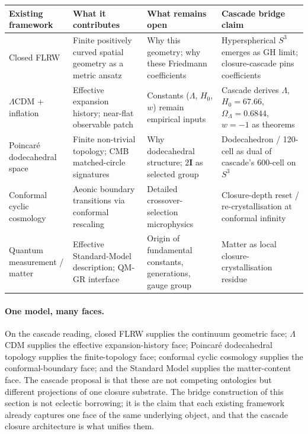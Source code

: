 \documentclass[11pt]{article}
\theoremstyle{plain}
\theoremstyle{definition}
\theoremstyle{remark}
\newcommand{\twoI}{2\mathbf{I}}
\begin{document}
\begin{center}
\renewcommand{\arraystretch}{1.25}
\begin{tabular}{p{3.0cm} p{3.6cm} p{3.6cm} p{4.4cm}}
\toprule
\textbf{Existing framework} & \textbf{What it contributes} & \textbf{What remains open} & \textbf{Cascade bridge claim} \\
\midrule
Closed FLRW & Finite positively curved spatial geometry as a metric ansatz & Why this geometry; why these Friedmann coefficients & Hyperspherical $S^3$ emerges as GH limit; closure-cascade pins coefficients \\
$\Lambda$CDM + inflation & Effective expansion history; near-flat observable patch & Constants ($\Lambda$, $H_0$, $w$) remain empirical inputs & Cascade derives $\Lambda$, $H_0 = 67.66$, $\Omega_\Lambda = 0.6844$, $w = -1$ as theorems \\
Poincar\'e dodecahedral space & Finite non-trivial topology; CMB matched-circle signatures & Why dodecahedral structure; $\twoI$ as selected group & Dodecahedron / 120-cell as dual of cascade's 600-cell on $S^3$ \\
Conformal cyclic cosmology & Aeonic boundary transitions via conformal rescaling & Detailed crossover-selection microphysics & Closure-depth reset / re-crystallisation at conformal infinity \\
Quantum measurement / matter & Effective Standard-Model description; QM-GR interface & Origin of fundamental constants, generations, gauge group & Matter as local closure-crystallisation residue \\
\bottomrule
\end{tabular}
\end{center}

\paragraph{One model, many faces.} On the cascade reading, closed FLRW supplies the continuum geometric face; $\Lambda$CDM supplies the effective expansion-history face; Poincar\'e dodecahedral topology supplies the finite-topology face; conformal cyclic cosmology supplies the conformal-boundary face; and the Standard Model supplies the matter-content face. The cascade proposal is that these are not competing ontologies but different projections of one closure substrate. The bridge construction of this section is not eclectic borrowing; it is the claim that each existing framework already captures one face of the same underlying object, and that the cascade closure architecture is what unifies them.
\end{document}
